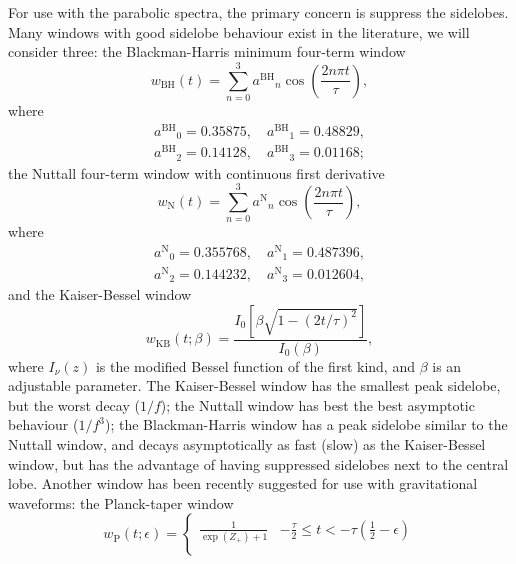 \documentclass[useAMS,usedcolumn,usegraphicx,usenatbib]{mn2e}
\newcommand{\sub}[1]{\ensuremath{_\mathrm{#1}}}
\newcommand{\super}[1]{\ensuremath{^\mathrm{#1}}}
\newcommand{\recip}[1]{\ensuremath{\frac{1}{#1}}}
\begin{document}
{For use with the parabolic spectra, the primary concern is suppress the sidelobes. Many windows with good sidelobe behaviour exist in the literature, we will consider three: the Blackman-Harris minimum four-term window \citep{Harris1978, Nuttall1981}
\begin{equation}
w\sub{BH}(t) = \sum_{n=0}^{3} a\super{BH}_n\cos\left(\frac{2n\pi t}{\tau}\right),
\end{equation}
where
\begin{equation}
\begin{split}
a\super{BH}_0 = 0.35875, \quad a\super{BH}_1 = 0.48829,\\
a\super{BH}_2 = 0.14128, \quad a\super{BH}_3 = 0.01168;
\end{split}
\end{equation}
the Nuttall four-term window with continuous first derivative \citep{Nuttall1981}
\begin{equation}
w\sub{N}(t) = \sum_{n=0}^{3} a\super{N}_n\cos\left(\frac{2n\pi t}{\tau}\right),
\end{equation}
where
\begin{equation}
\begin{split}
a\super{N}_0 = 0.355768, \quad a\super{N}_1 = 0.487396,\\
a\super{N}_2 = 0.144232, \quad a\super{N}_3 = 0.012604,
\end{split}
\end{equation}
and the Kaiser-Bessel window \citep{Harris1978, Kaiser1980}
\begin{equation}
w\sub{KB}(t;\beta) = \frac{I_0\left[\beta\sqrt{1 - (2 t/\tau)^2}\right]}{I_0(\beta)},
\end{equation}
where $I_\nu(z)$ is the modified Bessel function of the first kind, and $\beta$ is an adjustable parameter. The Kaiser-Bessel window has the smallest peak sidelobe, but the worst decay ($1/f$); the Nuttall window has best the best asymptotic behaviour ($1/f^3$); the Blackman-Harris window has a peak sidelobe similar to the Nuttall window, and decays asymptotically as fast (slow) as the Kaiser-Bessel window, but has the advantage of having suppressed sidelobes next to the central lobe. Another window has been recently suggested for use with gravitational waveforms: the Planck-taper window \citep{Damour2000,McKechan2010}
\begin{equation}
w\sub{P}(t; \epsilon) = \begin{cases}
 {\displaystyle \recip{\exp(Z_+)+1}} & {\displaystyle -\frac{\tau}{2} \leq t < -\tau\left(\recip{2} - \epsilon\right)} \\

\end{cases}
\end{equation}}
\end{document}
